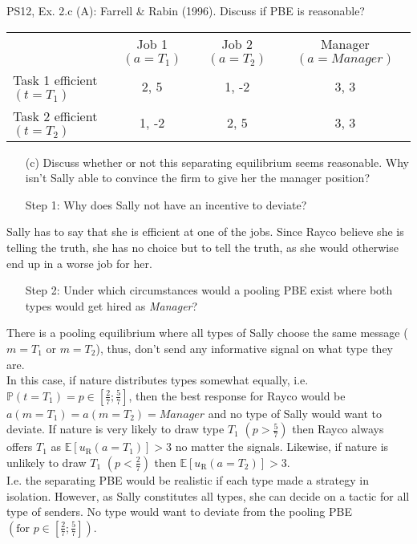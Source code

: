 \begin{frame}{PS12, Ex. 2.c (A): Farrell \& Rabin (1996). Discuss if PBE is reasonable?}
    \begin{table}
      \begin{tabular}{l|c|c|c|}
          \multicolumn{1}{c}{} & \multicolumn{1}{c}{Job 1 $(a=T_1)$} & \multicolumn{1}{c}{Job 2 $(a=T_2)$} & \multicolumn{1}{c}{Manager $(a=Manager)$} \\\cline{2-4}
           Task 1 efficient $(t=T_1)$ & 2, 5 & 1, -2 & 3, 3 \\\cline{2-4}
           Task 2 efficient $(t=T_2)$ & 1, -2 & 2, 5 & 3, 3 \\\cline{2-4}
      \end{tabular}
    \end{table}\vspace{-6pt}
    \begin{itemize}
      \item[(c)] Discuss whether or not this separating equilibrium seems reasonable. Why isn’t Sally able to convince the firm to give her the manager position?
      \item[Step 1:] Why does Sally not have an incentive to deviate?
    \end{itemize}\vspace{-6pt}
    Sally has to say that she is efficient at one of the jobs. Since Rayco believe she is telling the truth, she has no choice but to tell the truth, as she would otherwise end up in a worse job for her.\vspace{-6pt}
    \begin{itemize}
      \item[Step 2:] Under which circumstances would a pooling PBE exist where both types would get hired as \textit{Manager}?
    \end{itemize}\vspace{-6pt}
    There is a pooling equilibrium where all types of Sally choose the same message ($m=T_1$ or $m=T_2$), thus, don't send any informative signal on what type they are.\\
    In this case, if nature distributes types somewhat equally, i.e. $\mathbb{P}(t=T_1)=p\in\left[\frac{2}{7};\frac{5}{7}\right]$, then the best response for Rayco would be $a(m=T_1)=a(m=T_2)=Manager$ and no type of Sally would want to deviate.
    If nature is very likely to draw type $T_1$ $\left(p>\frac{5}{7}\right)$ then Rayco always offers $T_1$ as $\mathbb{E}[u_\text{R}(a=T_1)]>3$ no matter the signals.
    Likewise, if nature is unlikely to draw $T_1$ $\left(p<\frac{2}{7}\right)$ then $\mathbb{E}[u_\text{R}(a=T_2)]>3$.\\
    I.e. the separating PBE would be realistic if each type made a strategy in isolation. However, as Sally constitutes all types, she can decide on a tactic for all type of senders. No type would want to deviate from the pooling PBE $\left(\text{for }p\in\left[\frac{2}{7};\frac{5}{7}\right]\right)$.
    \vfill\null
\end{frame}
